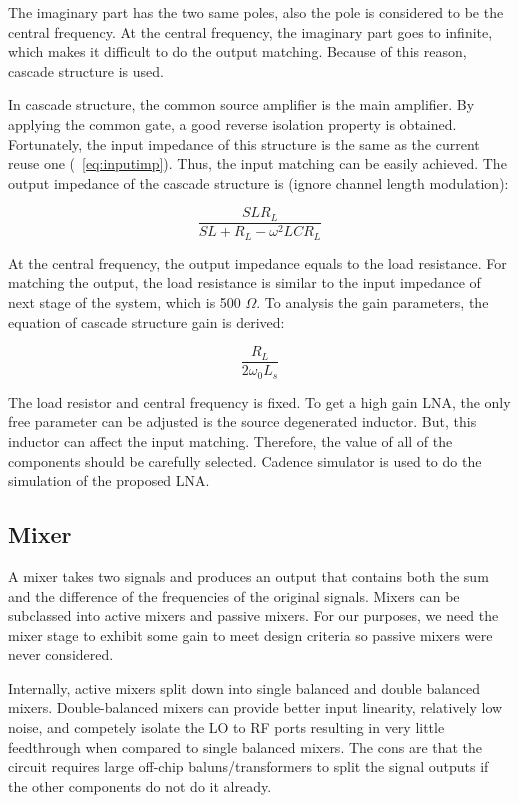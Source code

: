 The imaginary part has the two same poles, also the pole is considered to be the central frequency. At the central frequency, the imaginary part goes to infinite, which makes it difficult to do the output matching. Because of this reason, cascade structure is used.

In cascade structure, the common source amplifier is the main amplifier. By applying the common gate, a good reverse isolation property is obtained. Fortunately, the input impedance of this structure is the same as the current reuse one (~\ref{eq:inputimp}). Thus, the input matching can be easily achieved. The output impedance of the cascade structure is (ignore channel length modulation):

\begin{equation} 
  	\frac{SLR_L}{SL+R_L-\omega^2LCR_L}
\end{equation}

At the central frequency, the output impedance equals to the load resistance. For matching the output, the load resistance is similar to the input impedance of next stage of the system, which is 500 $\Omega$. To analysis the gain parameters, the equation of cascade structure gain is derived: 

\begin{equation} 
  	\frac{R_L}{2\omega_0L_s}
\end{equation}

The load resistor and central frequency is fixed. To get a high gain LNA, the only free parameter can be adjusted is the source degenerated inductor. But, this inductor can affect the input matching. Therefore, the value of all of the components should be carefully selected. Cadence simulator is used to do the simulation of the proposed LNA. 

\subsection{Mixer}

A mixer takes two signals and produces an output that contains both the sum and the difference of the frequencies of the original signals. Mixers can be subclassed into active mixers and passive mixers. For our purposes, we need the mixer stage to exhibit some gain to meet design criteria so passive mixers were never considered. 

Internally, active mixers split down into single balanced and double balanced mixers. Double-balanced mixers can provide better input linearity, relatively low noise, and competely isolate the LO to RF ports resulting in very little feedthrough when compared to single balanced mixers. The cons are that the circuit requires large off-chip baluns/transformers to split the signal outputs if the other components do not do it already. 

